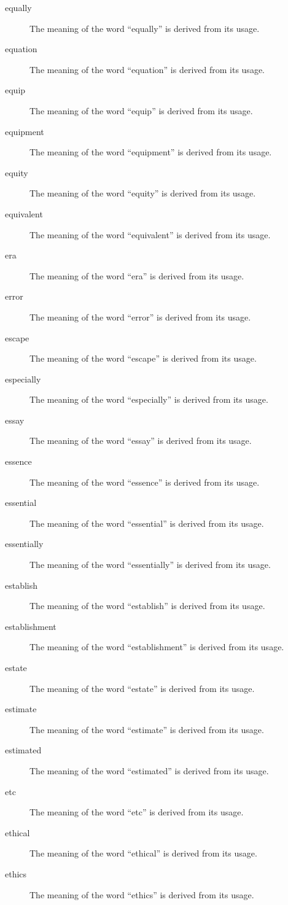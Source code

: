 \documentclass[12pt, letterpaper]{memoir}
\begin{document}
\begin{description}
\item[equally] The meaning of the word ``equally'' is derived from its usage.
\item[equation] The meaning of the word ``equation'' is derived from its usage.
\item[equip] The meaning of the word ``equip'' is derived from its usage.
\item[equipment] The meaning of the word ``equipment'' is derived from its usage.
\item[equity] The meaning of the word ``equity'' is derived from its usage.
\item[equivalent] The meaning of the word ``equivalent'' is derived from its usage.
\item[era] The meaning of the word ``era'' is derived from its usage.
\item[error] The meaning of the word ``error'' is derived from its usage.
\item[escape] The meaning of the word ``escape'' is derived from its usage.
\item[especially] The meaning of the word ``especially'' is derived from its usage.
\item[essay] The meaning of the word ``essay'' is derived from its usage.
\item[essence] The meaning of the word ``essence'' is derived from its usage.
\item[essential] The meaning of the word ``essential'' is derived from its usage.
\item[essentially] The meaning of the word ``essentially'' is derived from its usage.
\item[establish] The meaning of the word ``establish'' is derived from its usage.
\item[establishment] The meaning of the word ``establishment'' is derived from its usage.
\item[estate] The meaning of the word ``estate'' is derived from its usage.
\item[estimate] The meaning of the word ``estimate'' is derived from its usage.
\item[estimated] The meaning of the word ``estimated'' is derived from its usage.
\item[etc] The meaning of the word ``etc'' is derived from its usage.
\item[ethical] The meaning of the word ``ethical'' is derived from its usage.
\item[ethics] The meaning of the word ``ethics'' is derived from its usage.

\end{description}
\end{document}
